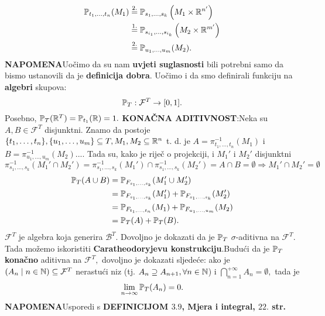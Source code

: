 \documentclass{article}
\begin{document}
\[\begin{aligned}\Bbb P_{t_1,\ldots,t_n}(M_1)&\overset{2.}{=}\Bbb P_{s_1,\ldots,s_k}\left(M_1\times\Bbb R^{n'}\right)\\&\overset{1.}{=}\Bbb P_{s_{i_1},\ldots,s_{i_k}}\left(M_2\times\Bbb R^{m'}\right)\\&\overset{2.}{=}\Bbb P_{u_1,\ldots,u_m}(M_2).\end{aligned}\]
\textbf{NAPOMENA}\newline Uočimo da su nam \textbf{uvjeti suglasnosti} bili potrebni samo da bismo ustanovili da je \textbf{definicija dobra}. Uočimo i da smo definirali funkciju na \textbf{algebri} skupova: \[\Bbb P_T:\mathcal F^T\to [0,1].\] Posebno, \(\Bbb P_T(\Bbb R^T)=\Bbb P_{t_1}(\Bbb R)=1.\)
\newline\textbf{KONAČNA ADITIVNOST}:\newline Neka su \(A,B\in\mathcal F^T\) disjunktni. Znamo da postoje \(\{t_1,\ldots,t_n\},\{u_1,\ldots,u_m\}\subseteq T, M_1,M_2\subseteq\Bbb R^n\) t. d. je \(A=\pi_{t_1,\ldots,t_n}^{-1}(M_1)\) i \(B=\pi_{u_1,\ldots,u_m}^{-1}(M_2).\)... Tada su, kako je riječ o projekciji, i \(M_1'\) i \(M_2'\) disjunktni \[\pi_{s_1,\ldots,s_k}^{-1}(M_1'\cap M_2')=\pi_{s_1,\ldots,s_k}^{-1}(M_1')\cap\pi_{s_1,\ldots,s_k}^{-1}(M_2')=A\cap B=\emptyset\Rightarrow M_1'\cap M_2'=\emptyset\]\[\begin{aligned}\Bbb P_T(A\cup B)&=\Bbb P_{F_{s_1,\ldots,s_k}}(M_1'\cup M_2')\\&=\Bbb P_{F_{s_1,\ldots,s_k}}(M_1')+\Bbb P_{F_{s_1,\ldots,s_k}}(M_2')\\&=\Bbb P_{F_{t_1,\ldots,t_n}}(M_1)+\Bbb P_{F_{u_1,\ldots,u_m}}(M_2)\\&=\Bbb P_T(A)+\Bbb P_T(B).\end{aligned}\] \(\mathcal F^T\) je algebra koja generira \(\mathcal B^T.\) Dovoljno je dokazati da je \(\Bbb P_T\) \(\sigma\)-aditivna na \(\mathcal F^T.\) Tada možemo iskoristiti \textbf{Caratheodoryjevu konstrukciju}.\newline Budući da je \(\Bbb P_T\) \textbf{konačno} aditivna na \(\mathcal F^T,\) dovoljno je dokazati sljedeće: ako je \((A_n\mid n\in\Bbb N)\subseteq\mathcal F^T\) nerastući niz (tj. \(A_n\supseteq A_{n+1},\forall n\in\Bbb N\)) i \(\bigcap_{n=1}^{+\infty}A_n=\emptyset,\) tada je \[\lim_{n\to\infty}\Bbb P_T(A_n)=0.\]
\textbf{NAPOMENA}\newline Usporedi s \textbf{ DEFINICIJOM \(3.9\), Mjera i integral, \(22.\) str.}\newline\newline
\end{document}
